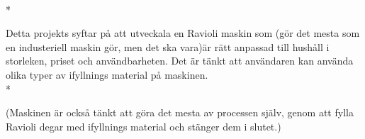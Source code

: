 \\*

Detta projekts syftar på att utveckala en Ravioli maskin som (gör det mesta som en industeriell maskin gör, men det ska vara)är rätt anpassad till hushåll i storleken, priset och användbarheten. Det är tänkt att användaren kan använda olika typer av ifyllnings material på maskinen.\\*

(Maskinen är också tänkt att göra det mesta av processen själv, genom att fylla Ravioli degar med ifyllnings material och stänger dem i slutet.)

